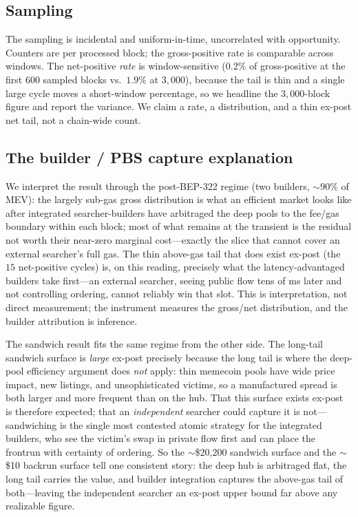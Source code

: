 \documentclass[11pt]{article}
\begin{document}
\subsection{Sampling}
The sampling is incidental and uniform-in-time, uncorrelated with opportunity.
Counters are per processed block; the gross-positive rate is comparable across
windows. The net-positive \emph{rate} is window-sensitive ($0.2\%$ of gross-positive
at the first $600$ sampled blocks vs.\ $1.9\%$ at $3{,}000$), because the tail is
thin and a single large cycle moves a short-window percentage, so we headline the
$3{,}000$-block figure and report the variance. We claim a rate, a distribution, and
a thin ex-post net tail, not a chain-wide count.

\subsection{The builder / PBS capture explanation}
\label{sec:builder}
We interpret the result through the post-BEP-322 regime
\cite{bep322,wang2025binance,blocksec2025pbs}
(two builders, $\sim$$90\%$ of MEV): the largely sub-gas gross distribution is what an
efficient market looks like after integrated searcher-builders have arbitraged the
deep pools to the fee/gas boundary within each block; most of what remains at the
transient is the residual not worth their near-zero marginal cost---exactly the slice
that cannot cover an external searcher's full gas. The thin above-gas tail that does
exist ex-post (the $15$ net-positive cycles) is, on this reading, precisely what the
latency-advantaged builders take first---an external searcher, seeing public flow
tens of ms later and not controlling ordering, cannot reliably win that slot. This is
interpretation, not direct measurement; the instrument measures the gross/net
distribution, and the builder attribution is inference.

The sandwich result fits the same regime from the other side. The long-tail sandwich
surface is \emph{large} ex-post precisely because the long tail is where the deep-pool
efficiency argument does \emph{not} apply: thin memecoin pools have wide price impact,
new listings, and unsophisticated victims, so a manufactured spread is both larger and
more frequent than on the hub. That this surface exists ex-post is therefore expected;
that an \emph{independent} searcher could capture it is not---sandwiching is the single
most contested atomic strategy for the integrated builders, who see the victim's swap
in private flow first and can place the frontrun with certainty of ordering. So the
$\sim$\$20{,}200 sandwich surface and the $\sim$\$10 backrun surface tell one
consistent story: the deep hub is arbitraged flat, the long tail carries the value,
and builder integration captures the above-gas tail of both---leaving the independent
searcher an ex-post upper bound far above any realizable figure.
\end{document}
